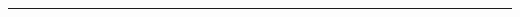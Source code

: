 \documentclass[12pt,oneside]{book}\raggedbottom{}
\begin{document}
\theoremstyle{Tema} \newtheorem{Tema}{Tema} %
\theoremstyle{Tema} \newtheorem{serie}{Serie}              %
\theoremstyle{Tema} \newtheorem{ejercicio}{Ejercicio}    %


{
\renewcommand{\headrulewidth}{1.5pt}
\fancyhead[R]{
			}
\fancyhead[L]{ 
	}
}

{
\renewcommand{\headrulewidth}{0.8 pt}
\fancyhead[R]{
			\emph{\myName{} $-$ \myCourse{}} %
			}
\fancyhead[L]{}  
\fancyfoot[C]{}
\fancyfoot[R]{\thepage}
}

\date{}
\setlength{\headheight}{0.5in} %

\pagestyle{allStyle}

\thispagestyle{firststyle}
\begin{center}
\LARGE
\textsc{\myName}\\%
\bigskip
\hrule height 1.5pt
\end{center}
\setcounter{chapter}{1}
\end{document}
